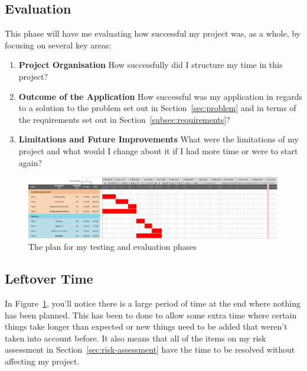 \subsection*{Evaluation}
This phase will have me evaluating how successful my project was, as a whole, by focusing on several key areas:

\begin{enumerate}
  \item \textbf{Project Organisation} How successfully did I structure my time in this project?
  \item \textbf{Outcome of the Application} How successful was my application in regards to a solution to the problem set out in Section~\ref{sec:problem} and in terms of the requirements set out in Section~\ref{subsec:requirements}?
  \item \textbf{Limitations and Future Improvements} What were the limitations of my project and what would I change about it if I had more time or were to start again?
\end{enumerate}

\begin{figure}[ht]
  \centering
  \includegraphics[width=\textwidth]{assets/images/charts/gantt/testing-evaluation.png}
  \caption{The plan for my testing and evaluation phases}
  \label{fig:final-gantt}
\end{figure}

\subsection*{Leftover Time}

In Figure~\ref{fig:final-gantt}, you'll notice there is a large period of time at the end where nothing has been planned. This has been to done to allow some extra time where certain things take longer than expected or new things need to be added that weren't taken into account before. It also means that all of the items on my risk assessment in Section~\ref{sec:risk-assessment} have the time to be resolved without affecting my project.
